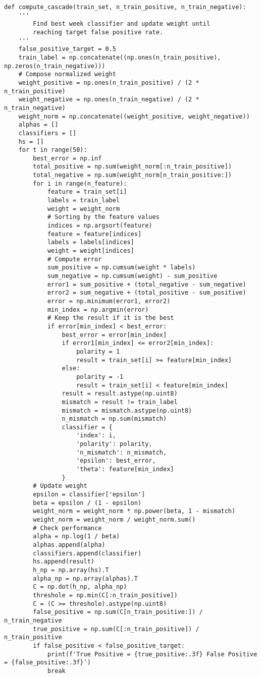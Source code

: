 \documentclass[11pt]{article}
\begin{document}
\begin{lstlisting}
def compute_cascade(train_set, n_train_positive, n_train_negative):
    ''' 
        Find best week classifier and update weight until 
        reaching target false positive rate.
    '''
    false_positive_target = 0.5
    train_label = np.concatenate((np.ones(n_train_positive), np.zeros(n_train_negative)))
    # Compose normalized weight
    weight_positive = np.ones(n_train_positive) / (2 * n_train_positive)
    weight_negative = np.ones(n_train_negative) / (2 * n_train_negative)
    weight_norm = np.concatenate((weight_positive, weight_negative))
    alphas = []
    classifiers = []
    hs = []
    for t in range(50):
        best_error = np.inf
        total_positive = np.sum(weight_norm[:n_train_positive])
        total_negative = np.sum(weight_norm[n_train_positive:])
        for i in range(n_feature):
            feature = train_set[i]
            labels = train_label
            weight = weight_norm
            # Sorting by the feature values
            indices = np.argsort(feature)
            feature = feature[indices]
            labels = labels[indices]
            weight = weight[indices]
            # Compute error
            sum_positive = np.cumsum(weight * labels)
            sum_negative = np.cumsum(weight) - sum_positive
            error1 = sum_positive + (total_negative - sum_negative)
            error2 = sum_negative + (total_positive - sum_positive)
            error = np.minimum(error1, error2)
            min_index = np.argmin(error)
            # Keep the result if it is the best
            if error[min_index] < best_error:
                best_error = error[min_index]
                if error1[min_index] <= error2[min_index]:
                    polarity = 1
                    result = train_set[i] >= feature[min_index]
                else:
                    polarity = -1
                    result = train_set[i] < feature[min_index]
                result = result.astype(np.uint8)
                mismatch = result != train_label
                mismatch = mismatch.astype(np.uint8)
                n_mismatch = np.sum(mismatch)
                classifier = {
                    'index': i,
                    'polarity': polarity,
                    'n_mismatch': n_mismatch,
                    'epsilon': best_error,
                    'theta': feature[min_index]
                }
        # Update weight
        epsilon = classifier['epsilon']
        beta = epsilon / (1 - epsilon)
        weight_norm = weight_norm * np.power(beta, 1 - mismatch)
        weight_norm = weight_norm / weight_norm.sum()
        # Check performance
        alpha = np.log(1 / beta)
        alphas.append(alpha)
        classifiers.append(classifier)
        hs.append(result)
        h_np = np.array(hs).T
        alpha_np = np.array(alphas).T
        C = np.dot(h_np, alpha_np)
        threshole = np.min(C[:n_train_positive])
        C = (C >= threshole).astype(np.uint8)
        false_positive = np.sum(C[n_train_positive:]) / n_train_negative
        true_positive = np.sum(C[:n_train_positive]) / n_train_positive
        if false_positive < false_positive_target:
            print(f'True Positive = {true_positive:.3f} False Positive = {false_positive:.3f}')
            break


\end{lstlisting}
\end{document}
